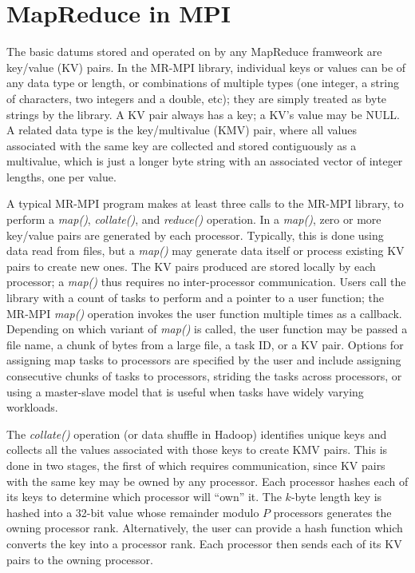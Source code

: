 \section{MapReduce in MPI}
\label{sec:mr}

The basic datums stored and operated on by any MapReduce framweork are
key/value (KV) pairs.  In the MR-MPI library, individual keys or
values can be of any data type or length, or combinations of multiple
types (one integer, a string of characters, two integers and a double,
etc); they are simply treated as byte strings by the library.  A KV
pair always has a key; a KV's value may be NULL.  A related data type is
the key/multivalue (KMV) pair, where all values associated with the
same key are collected and stored contiguously as a multivalue, which
is just a longer byte string with an associated vector of integer
lengths, one per value.

A typical MR-MPI program makes at least three calls to the MR-MPI library,
to perform a {\it map()}, {\it collate()}, and {\it reduce()}
operation.  In a {\it map()}, zero or more key/value pairs are
generated by each processor.  Typically, this is done using data read
from files, but a {\it map()} may generate data itself or process
existing KV pairs to create new ones.  The KV pairs produced are
stored locally by each processor; a {\it map()} thus requires no
inter-processor communication.  Users call the library with a count of
tasks to perform and a pointer to a user function; the MR-MPI {\it
map()} operation invokes the user function multiple times as a
callback.  Depending on which variant of {\it map()} is called, the
user function may be passed a file name, a chunk of bytes from a large
file, a task ID, or a KV pair.  Options for assigning map tasks to processors
are specified by the user and include assigning consecutive 
chunks of tasks to processors, striding the tasks across processors,
or using a master-slave model that is useful when tasks have widely
varying workloads.

The {\it collate()} operation (or data shuffle in Hadoop) identifies
unique keys and collects all the values associated with those keys to
create KMV pairs.  This is done in two stages, the first of which
requires communication, since KV pairs with the same key may be owned
by any processor.  Each processor hashes each of its keys to determine
which processor will ``own'' it.  The $k$-byte length key is hashed into
a 32-bit value whose remainder modulo $P$ processors generates the owning
processor rank.  Alternatively, the user can provide a hash function
which converts the key into a processor rank.  Each processor then sends
each of its KV pairs to the owning processor.

